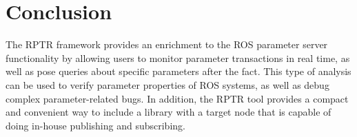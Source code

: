 \section{Conclusion}

The RPTR framework provides an enrichment to the ROS parameter server functionality by allowing users to monitor parameter transactions in real time, as well as pose queries about specific parameters after the fact. This type of analysis can be used to verify parameter properties of ROS systems, as well as debug complex parameter-related bugs. In addition, the RPTR tool provides a compact and convenient way to include a library with a target node that is capable of doing in-house publishing and subscribing.
